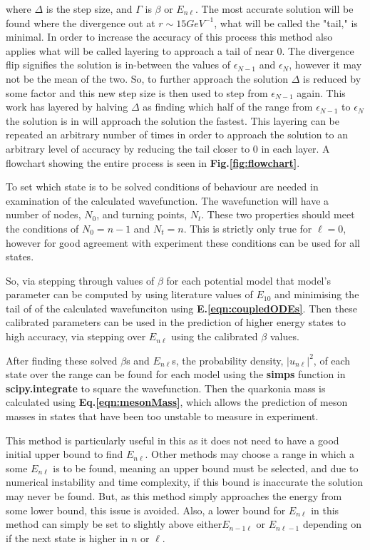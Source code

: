 \documentclass[10pt,twocolumn]{revtex4}    %
\begin{document}
where $\Delta$ is the step size, and $\Gamma$ is $\beta$ or $E_{n\ell}$. 
The most accurate solution will be found where the divergence out at $r \sim 15GeV^{-1}$, what will be called the "tail," is minimal. In order to increase the accuracy of this process this method also applies what will be called layering to approach a tail of near $0$. The divergence flip signifies the solution is in-between the values of $\epsilon_{N-1}$ and $\epsilon_N$, however it may not be the mean of the two. So, to further approach the solution $\Delta$ is reduced by some factor and this new step size is then used to step from  $\epsilon_{N-1}$ again. This work has layered by halving $\Delta$ as finding which half of the range from $\epsilon_{N-1}$ to $\epsilon_N$ the solution is in will approach the solution the fastest. This layering can be repeated an arbitrary number of times in order to approach the solution to an arbitrary level of accuracy by reducing the tail closer to $0$ in each layer. A flowchart showing the entire process is seen in \textbf{Fig.\ref{fig:flowchart}}. 

To set which state is to be solved conditions of behaviour are needed in examination of the calculated wavefunction. The wavefunction will have a number of nodes, $N_0$, and turning points, $N_t$. These two properties should meet the conditions of $N_0 = n-1$ and $N_t = n$. This is strictly only true for $\ell = 0$, however for good agreement with experiment these conditions can be used for all states. 

So, via stepping through values of $\beta$ for each potential model that model's parameter can be computed by using literature values of $E_{10}$ and minimising the tail of of the calculated wavefunciton using \textbf{E.\ref{eqn:coupledODEs}}. Then these calibrated parameters can be used in the prediction of higher energy states to high accuracy, via stepping over $E_{n\ell}$ using the calibrated $\beta$ values.


After finding these solved $\beta$s and $E_{n\ell}$s, the probability density, $|u_{n\ell}|^2$, of each state over the range can be found for each model using the \textbf{simps} function in \textbf{scipy.integrate} to square the wavefunction. Then the quarkonia mass is calculated using \textbf{Eq.\ref{eqn:mesonMass}}, which allows the prediction of meson masses in states that have been too unstable to measure in experiment. 

This method is particularly useful in this as it does not need to have a good initial upper bound to find $E_{n\ell}$. Other methods may choose a range in which a some $E_{n\ell}$ is to be found, meaning an upper bound must be selected, and due to numerical instability and time complexity, if this bound is inaccurate the solution may never be found. But, as this method simply approaches the energy from some lower bound, this issue is avoided. Also, a lower bound for $E_{n\ell}$ in this method can simply be set to slightly above either$E_{n-1\ell}$ or $E_{n\ell-1}$ depending on if the next state is higher in $n$ or $\ell$.
 
\end{document}
